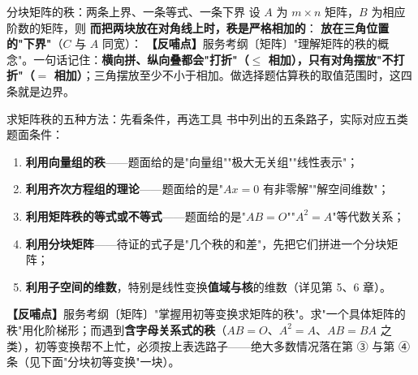 \begin{fdeep}{分块矩阵的秩：两条上界、一条等式、一条下界}
设 $A$ 为 $m\times n$ 矩阵，$B$ 为相应阶数的矩阵，则
\textbf{而把两块放在对角线上时，秩是严格相加的}：
\textbf{放在三角位置的"下界"}（$C$ 与 $A$ 同宽）：
\textbf{【反哺点】}服务考纲〔矩阵〕"理解矩阵的秩的概念"。一句话记住：\textbf{横向拼、纵向叠都会"打折"（$\le$ 相加），只有对角摆放"不打折"（$=$ 相加）}；三角摆放至少不小于相加。做选择题估算秩的取值范围时，这四条就是边界。
\end{fdeep}


\begin{fdeep}{求矩阵秩的五种方法：先看条件，再选工具}
书中列出的五条路子，实际对应五类题面条件：
\begin{enumerate}[leftmargin=2.4em,itemsep=0.22em]
\item \textbf{利用向量组的秩}——题面给的是"向量组""极大无关组""线性表示"；
\item \textbf{利用齐次方程组的理论}——题面给的是"$Ax=0$ 有非零解""解空间维数"；
\item \textbf{利用矩阵秩的等式或不等式}——题面给的是"$AB=O$""$A^{2}=A$"等代数关系；
\item \textbf{利用分块矩阵}——待证的式子是"几个秩的和差"，先把它们拼进一个分块矩阵；
\item \textbf{利用子空间的维数}，特别是线性变换\textbf{值域与核}的维数（详见第 5、6 章）。
\end{enumerate}
\textbf{【反哺点】}服务考纲〔矩阵〕"掌握用初等变换求矩阵的秩"。求"一个具体矩阵的秩"用化阶梯形；而遇到\textbf{含字母关系式的秩}（$AB=O$、$A^{2}=A$、$AB=BA$ 之类），初等变换帮不上忙，必须按上表选路子——绝大多数情况落在第 ③ 与第 ④ 条（见下面"分块初等变换"一块）。
\end{fdeep}


